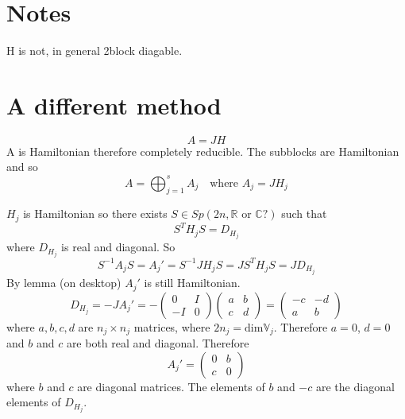 \section{Notes}
H is not, in general 2block diagable.

\section{A different method}
\begin{equation}
A = JH
\end{equation}
A is Hamiltonian therefore completely reducible. The subblocks are Hamiltonian and so
\begin{equation}
A = \bigoplus_{j=1}^s A_j \quad \text{where } A_j = JH_j
\end{equation}


$H_j$ is Hamiltonian so there exists $S \in Sp(2n,\mathbb{R} \text{ or } \mathbb{C}?)$ such that 
\begin{equation}
S^TH_jS = D_{H_j}
\end{equation}
where $D_{H_j}$ is real and diagonal. So
\begin{equation}
S^{-1}A_jS = A_j' = S^{-1}JH_jS = JS^TH_jS = JD_{H_j}
\end{equation}
By lemma (on desktop) $A_j'$ is still Hamiltonian.
\begin{equation}
D_{H_j} = -JA_j' = -\begin{pmatrix} 0 & I \\ -I & 0 \end{pmatrix}\begin{pmatrix}a & b \\ c & d \end{pmatrix} = \begin{pmatrix} -c & -d \\ a & b \end{pmatrix}
\end{equation}
where $a, b, c, d$ are $n_j \times n_j$ matrices, where $2n_j = \text{dim}\mathbb{V}_j$. Therefore $a = 0$, $d = 0$ and $b$ and $c$ are both real and diagonal. Therefore
\begin{equation}
A_j' = \begin{pmatrix} 0 & b \\ c & 0 \end{pmatrix}
\end{equation}
where $b$ and $c$ are diagonal matrices. The elements of $b$ and $-c$ are the diagonal elements of $D_{H_j}$.\\

